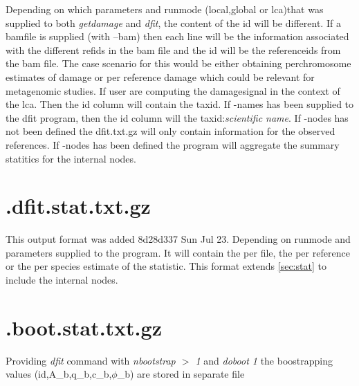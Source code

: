 \documentclass[10pt]{article}
\begin{document}
Depending on which parameters and runmode (local,global or lca)that was supplied to both
\emph{getdamage} and \emph{dfit}, the content of the id will be
different. If a bamfile is supplied (with --bam) then each line will be
the information associated with the different refids in the bam file
and the id will be the referenceids from the bam file. The case
scenario for this would be either obtaining perchromosome estimates of
damage or per reference damage which could be relevant for metagenomic
studies. If user are computing the damagesignal in the context of the
lca. Then the id column will contain the taxid. If -names has been
supplied to the dfit program, then the id column will the
taxid:\emph{scientific name}. If -nodes has not been defined the
dfit.txt.gz will only contain information for the observed
references. If -nodes has been defined the program will aggregate the
summary statitics for the internal nodes.
\section{.dfit.stat.txt.gz}
This output format was added 8d28d337 Sun Jul 23.  Depending on
runmode and parameters supplied to the program. It will contain the
per file, the per reference or the per species estimate of the
statistic. This format extends \ref{sec:stat} to include the internal
nodes.

\section{.boot.stat.txt.gz}
Providing \textit{dfit} command with \textit{nbootstrap $>$ 1} and \textit{doboot 1} the boostrapping values (id,A\_b,q\_b,c\_b,$\phi$\_b) are stored in separate file
\end{document}
